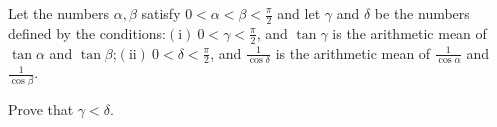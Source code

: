 Let the numbers $\alpha ,\beta $ satisfy $0<\alpha <\beta <\frac{\pi}{2}$ and let $\gamma $ and $\delta $ be the numbers defined by the conditions:$(\text{i})\ 0<\gamma<\frac{\pi}{2}$,  and $\tan\gamma$ is the arithmetic mean of $\tan\alpha$ and $\tan\beta$;$(\text{ii})\ 0<\delta<\frac{\pi}{2}$,  and $\frac{1}{\cos\delta}$ is the arithmetic mean of $\frac{1}{\cos\alpha}$ and $\frac{1}{\cos\beta}$.

Prove that $\gamma <\delta $.